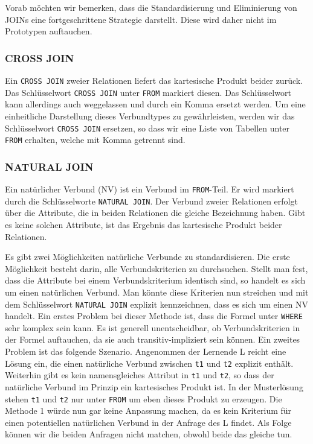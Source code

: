 Vorab möchten wir bemerken, dass die Standardisierung und Eliminierung von JOINs eine fortgeschrittene Strategie darstellt. Diese wird daher nicht im Prototypen auftauchen.

\subsubsection*{CROSS JOIN}

Ein \verb|CROSS JOIN| zweier Relationen liefert das kartesische Produkt beider zurück. Das Schlüsselwort \verb|CROSS JOIN| unter \verb|FROM| markiert diesen. Das Schlüsselwort kann allerdings auch weggelassen und durch ein Komma ersetzt werden. Um eine einheitliche Darstellung dieses Verbundtypes zu gewährleisten, werden wir das Schlüsselwort \verb|CROSS JOIN| ersetzen, so dass wir eine Liste von Tabellen unter \verb|FROM| erhalten, welche mit Komma getrennt sind.

\subsubsection*{NATURAL JOIN}

Ein natürlicher Verbund (NV) ist ein Verbund im \verb|FROM|-Teil. Er wird markiert durch die Schlüsselworte \verb|NATURAL JOIN|. Der Verbund zweier Relationen erfolgt über die Attribute, die in beiden Relationen die gleiche Bezeichnung haben. Gibt es keine solchen Attribute, ist das Ergebnis das kartesische Produkt beider Relationen.

Es gibt zwei Möglichkeiten natürliche Verbunde zu standardisieren. Die erste Möglichkeit besteht darin,   alle Verbundskriterien zu durchsuchen. Stellt man fest, dass die Attribute bei einem Verbundskriterium identisch sind, so handelt es sich um einen natürlichen Verbund. Man könnte diese Kriterien nun streichen und mit dem Schlüsselwort \verb|NATURAL JOIN| explizit kennzeichnen, dass es sich um einen NV handelt. Ein erstes Problem bei dieser Methode ist, dass die Formel unter \verb|WHERE| sehr komplex sein kann. Es ist generell unentscheidbar, ob Verbundskriterien in der Formel auftauchen, da sie auch transitiv-impliziert sein können. Ein zweites Problem ist das folgende Szenario. Angenommen der Lernende L reicht eine Lösung ein, die einen natürliche Verbund zwischen \verb|t1| und \verb|t2| explizit enthält. Weiterhin gibt es kein namensgleiches Attribut in \verb|t1| und \verb|t2|, so dass der natürliche Verbund im Prinzip ein kartesisches Produkt ist. In der Musterlösung stehen \verb|t1| und \verb|t2| nur unter \verb|FROM| um eben dieses Produkt zu erzeugen. Die Methode 1 würde nun gar keine Anpassung machen, da es kein Kriterium für einen potentiellen natürlichen Verbund in der Anfrage des L findet. Als Folge können wir die beiden Anfragen nicht matchen, obwohl beide das gleiche tun.

